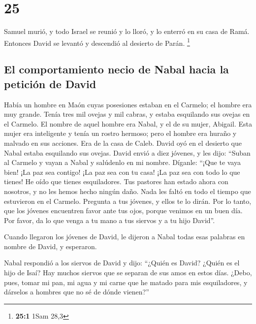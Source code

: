 \hypertarget{section-24}{%
\section{25}\label{section-24}}

 Samuel murió, y todo Israel se reunió y lo lloró, y lo
enterró en su casa de Ramá. Entonces David se levantó y descendió al
desierto de Parán. \footnote{\textbf{25:1} 1Sam 28,3}

\hypertarget{el-comportamiento-necio-de-nabal-hacia-la-peticiuxf3n-de-david}{%
\subsection{El comportamiento necio de Nabal hacia la petición de
David}\label{el-comportamiento-necio-de-nabal-hacia-la-peticiuxf3n-de-david}}

 Había un hombre en Maón cuyas posesiones estaban en el
Carmelo; el hombre era muy grande. Tenía tres mil ovejas y mil cabras, y
estaba esquilando sus ovejas en el Carmelo.  El nombre de
aquel hombre era Nabal, y el de su mujer, Abigail. Esta mujer era
inteligente y tenía un rostro hermoso; pero el hombre era huraño y
malvado en sus acciones. Era de la casa de Caleb.  David
oyó en el desierto que Nabal estaba esquilando sus ovejas.
 David envió a diez jóvenes, y les dijo: ``Suban al
Carmelo y vayan a Nabal y salúdenlo en mi nombre. 
Díganle: ``¡Que te vaya bien! ¡La paz sea contigo! ¡La paz sea con tu
casa! ¡La paz sea con todo lo que tienes!  He oído que
tienes esquiladores. Tus pastores han estado ahora con nosotros, y no
les hemos hecho ningún daño. Nada les faltó en todo el tiempo que
estuvieron en el Carmelo.  Pregunta a tus jóvenes, y ellos
te lo dirán. Por lo tanto, que los jóvenes encuentren favor ante tus
ojos, porque venimos en un buen día. Por favor, da lo que venga a tu
mano a tus siervos y a tu hijo David''.

 Cuando llegaron los jóvenes de David, le dijeron a Nabal
todas esas palabras en nombre de David, y esperaron.

 Nabal respondió a los siervos de David y dijo: ``¿Quién
es David? ¿Quién es el hijo de Isaí? Hay muchos siervos que se separan
de sus amos en estos días.  ¿Debo, pues, tomar mi pan, mi
agua y mi carne que he matado para mis esquiladores, y dárselos a
hombres que no sé de dónde vienen?''

